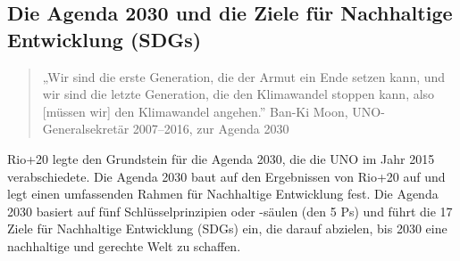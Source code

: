\documentclass[
  nswissgerman,
  a4paper,
  openany]{book}
\begin{document}
\subsection{Die Agenda 2030 und die Ziele für Nachhaltige Entwicklung
(SDGs)}\label{die-agenda-2030-und-die-ziele-fuxfcr-nachhaltige-entwicklung-sdgs}

\begin{quote}
„Wir sind die erste Generation, die der Armut ein Ende setzen kann, und
wir sind die letzte Generation, die den Klimawandel stoppen kann, also
{[}müssen wir{]} den Klimawandel angehen.'' Ban-Ki Moon,
UNO-Generalsekretär 2007--2016, zur Agenda 2030
\end{quote}

Rio+20 legte den Grundstein für die Agenda 2030, die die UNO im Jahr
2015 verabschiedete. Die Agenda 2030 baut auf den Ergebnissen von Rio+20
auf und legt einen umfassenden Rahmen für Nachhaltige Entwicklung fest.
Die Agenda 2030 basiert auf fünf Schlüsselprinzipien oder -säulen (den 5
Ps) und führt die 17 Ziele für Nachhaltige Entwicklung (SDGs) ein, die
darauf abzielen, bis 2030 eine nachhaltige und gerechte Welt zu
schaffen.
\end{document}

